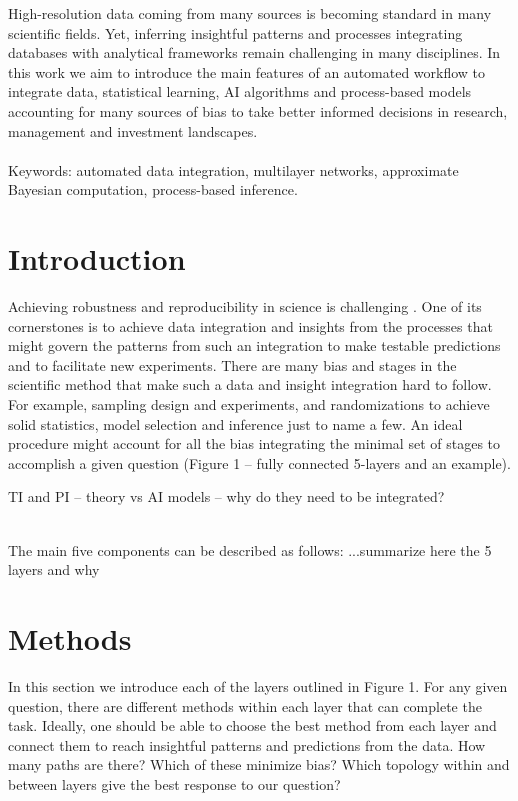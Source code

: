 \documentclass[english,12pt]{article}
\begin{document}
High-resolution data coming from many sources is becoming standard in
many scientific fields. Yet, inferring insightful patterns and
processes integrating databases with analytical frameworks remain
challenging in many disciplines. In this work we aim to introduce the
main features of an automated workflow to integrate data, statistical
learning, AI algorithms and process-based models accounting for many
sources of bias to take better informed decisions in research,
management and investment landscapes.
\\
\\
Keywords: automated data integration, multilayer networks, approximate
Bayesian computation, process-based inference.
\newpage


\section{Introduction}

Achieving robustness and reproducibility in science is challenging
\citep{Ioannidis:2005}. One of its cornerstones is to achieve data
integration and insights from the processes that might govern the
patterns from such an integration to make testable predictions and to
facilitate new experiments. There are many bias and stages in the
scientific method that make such a data and insight integration hard
to follow. For example, sampling design and experiments,  and randomizations to achieve solid statistics, model
selection and inference just to name a few. An ideal procedure might
account for all the bias integrating the minimal set of stages to
accomplish a given question (Figure 1 -- fully connected 5-layers and
an example).

TI and PI -- theory vs AI models -- why do they need to be integrated?

\\




The main five components can be described as follows: 
...summarize here the 5 layers and why
\\


\section{Methods}

In this section we introduce each of the layers outlined in Figure
1. For any given question, there are different methods within each
layer that can complete the task. Ideally, one should be able to
choose the best method from each layer and connect them to reach
insightful patterns and predictions from the data. How many paths are
there? Which of these minimize bias? Which topology within and between
layers give the best response to our question?
\end{document}
